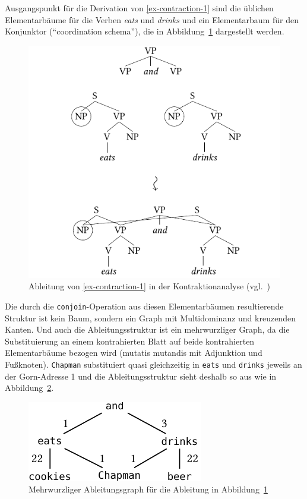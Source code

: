 Ausgangspunkt für die Derivation von \ref{ex-contraction-1} sind die üblichen Elementarbäume für die Verben {\it eats} und {\it drinks} und ein Elementarbaum für den Konjunktor ("`coordination schema"'), die in Abbildung~\ref{fig-contraction-1} dargestellt werden.
\begin{figure}[t]
\centering
\includegraphics{graphics/abb85.pdf}
\caption{\label{fig-contraction-1}Ableitung von \ref{ex-contraction-1} in der Kontraktionanalyse (vgl.\ \citealt[Figure~7]{Sarkar:Joshi:97})}
\end{figure}
Die durch die {\tt conjoin}-Operation aus diesen Elementarbäumen resultierende Struktur ist kein Baum, sondern ein Graph mit Multidominanz und kreuzenden Kanten. Und auch die Ableitungsstruktur ist ein mehrwurzliger Graph, da die Substituierung an einem kontrahierten Blatt auf beide kontrahierten Elementarbäume bezogen wird (mutatis mutandis mit Adjunktion und Fu\ss knoten). {\tt Chapman} substituiert quasi gleichzeitig in {\tt eats} und {\tt drinks} jeweils an der Gorn-Adresse 1 und die Ableitungsstruktur sieht deshalb so aus wie in Abbildung~\ref{fig-contraction-2}.

\begin{figure}[t]
\centering
\includegraphics{graphics/abb86.pdf}
\caption{\label{fig-contraction-2}Mehrwurzliger Ableitungsgraph für die Ableitung in Abbildung~\ref{fig-contraction-1}}
\end{figure}

